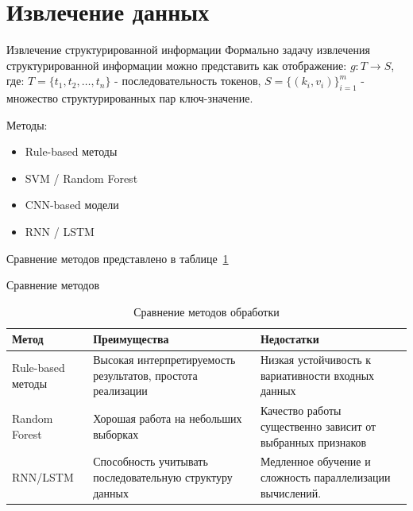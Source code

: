 \documentclass[aspectratio=169]{beamer}
\begin{document}
\section{Извлечение данных}

\begin{frame}{Извлечение структурированной информации}
Формально задачу извлечения структурированной информации
можно представить как отображение: $g : T \rightarrow S$, где: $T=\{t_1,t_2,\dots,t_n\}$ - последовательность токенов, $S=\{(k_i,v_i)\}_{i=1}^{m}$ - множество структурированных пар
ключ-значение.

\pause

Методы:
\begin{itemize}
\item Rule-based методы
\item SVM / Random Forest
\item CNN-based модели
\item RNN / LSTM
\end{itemize}

Сравнение методов представлено в таблице~\ref{tab:methods}

\end{frame}

\begin{frame}{Сравнение методов}

\begin{table}
\centering
\caption{Сравнение методов обработки}
\label{tab:methods}

\begin{tabular}{|p{2cm}|p{4cm}|p{5cm}|}
\toprule
Метод & Преимущества & Недостатки \\
\midrule
Rule-based методы & Высокая интерпретируемость результатов, простота реализации & Низкая устойчивость к вариативности входных данных \\
\hline
Random Forest & Хорошая работа на небольших выборках & Качество работы существенно зависит от выбранных признаков \\
\hline
RNN/LSTM & Способность учитывать последовательную структуру данных & Медленное обучение и сложность параллелизации вычислений. \\
\hline
\end{tabular}
\end{table}


\end{frame}

\end{document}
